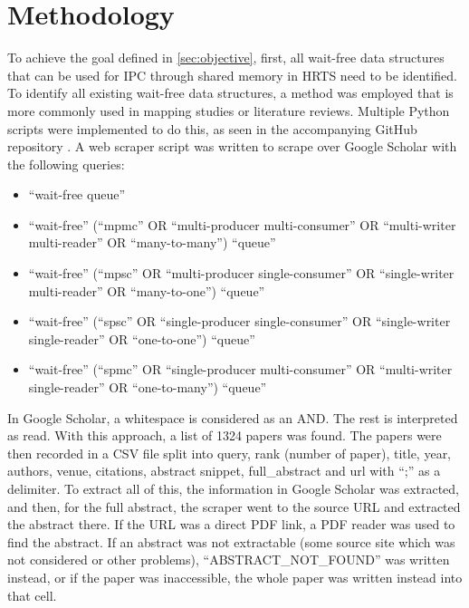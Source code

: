 \chapter{Methodology}\label{ch:methodology}
To achieve the goal defined in \cref{sec:objective}, first, all wait-free data structures that can be used for \ac{IPC} through shared memory in \ac{HRTS} need to be identified. To identify all existing wait-free data structures, a method was employed that is more commonly used in mapping studies or literature reviews. Multiple Python scripts were implemented to do this, as seen in the accompanying GitHub repository \cite{githubMA}. A web scraper script was written to scrape over Google Scholar with the following queries:
\begin{itemize}
   \item \enquote{wait-free queue}
   \item \enquote{wait-free} (\enquote{mpmc} OR \enquote{multi-producer multi-consumer} OR \enquote{multi-writer multi-reader} OR \enquote{many-to-many}) \enquote{queue}
   \item \enquote{wait-free} (\enquote{mpsc} OR \enquote{multi-producer single-consumer} OR \enquote{single-writer multi-reader} OR \enquote{many-to-one}) \enquote{queue}
   \item \enquote{wait-free} (\enquote{spsc} OR \enquote{single-producer single-consumer} OR \enquote{single-writer single-reader} OR \enquote{one-to-one}) \enquote{queue}
   \item \enquote{wait-free} (\enquote{spmc} OR \enquote{single-producer multi-consumer} OR \enquote{multi-writer single-reader} OR \enquote{one-to-many}) \enquote{queue}
\end{itemize}
In Google Scholar, a whitespace is considered as an AND. The rest is interpreted as read. With this approach, a list of 1324 papers was found. The papers were then recorded in a CSV file split into query, rank (number of paper), title, year, authors, venue, citations, abstract snippet, full\_abstract and url with \enquote{;} as a delimiter. To extract all of this, the information in Google Scholar was extracted, and then, for the full abstract, the scraper went to the source URL and extracted the abstract there. If the URL was a direct PDF link, a PDF reader was used to find the abstract. If an abstract was not extractable (some source site which was not considered or other problems), \enquote{ABSTRACT\_NOT\_FOUND} was written instead, or if the paper was inaccessible, the whole paper was written instead into that cell.
